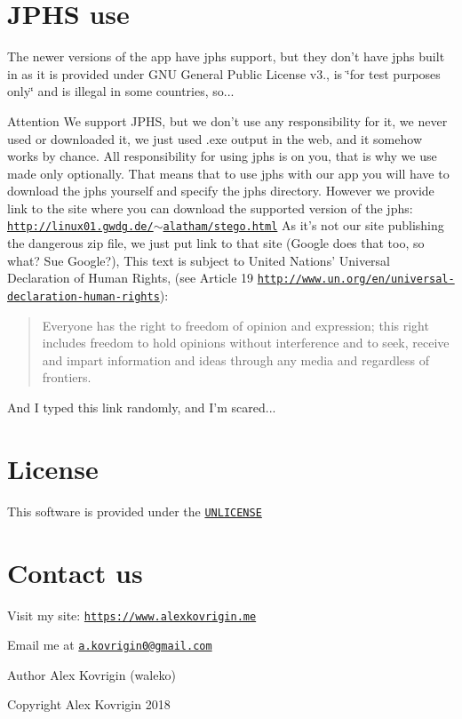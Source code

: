 \hypertarget{index_jphs-use}{}\section{J\-P\-H\-S use}\label{index_jphs-use}
The newer versions of the app have jphs support, but they don't have jphs built in as it is provided under G\-N\-U General Public License v3., is \char`\"{}for test purposes only\char`\"{} and is illegal in some countries, so... \begin{DoxyAttention}{Attention}
We support J\-P\-H\-S, but we don't use any responsibility for it, we never used or downloaded it, we just used .exe output in the web, and it somehow works by chance. All responsibility for using jphs is on you, that is why we use made only optionally. That means that to use jphs with our app you will have to download the jphs yourself and specify the jphs directory. However we provide link to the site where you can download the supported version of the jphs\-: \href{http://linux01.gwdg.de/~alatham/stego.html}{\tt http\-://linux01.\-gwdg.\-de/$\sim$alatham/stego.\-html} As it's not our site publishing the dangerous zip file, we just put link to that site (Google does that too, so what? Sue Google?), This text is subject to United Nations' Universal Declaration of Human Rights, (see Article 19 \href{http://www.un.org/en/universal-declaration-human-rights}{\tt http\-://www.\-un.\-org/en/universal-\/declaration-\/human-\/rights})\-: \begin{quotation}
Everyone has the right to freedom of opinion and expression; this right includes freedom to hold opinions without interference and to seek, receive and impart information and ideas through any media and regardless of frontiers.

\end{quotation}
And I typed this link randomly, and I'm scared...
\end{DoxyAttention}
\hypertarget{index_license}{}\section{License}\label{index_license}
This software is provided under the \href{http://unlicense.org}{\tt U\-N\-L\-I\-C\-E\-N\-S\-E}\hypertarget{index_contact}{}\section{Contact us}\label{index_contact}
Visit my site\-: \href{https://www.alexkovrigin.me}{\tt https\-://www.\-alexkovrigin.\-me}

Email me at \href{mailto:a.kovrigin0@gmail.com}{\tt a.\-kovrigin0@gmail.\-com}

\begin{DoxyAuthor}{Author}
Alex Kovrigin (waleko) 
\end{DoxyAuthor}
\begin{DoxyCopyright}{Copyright}
Alex Kovrigin 2018  
\end{DoxyCopyright}
